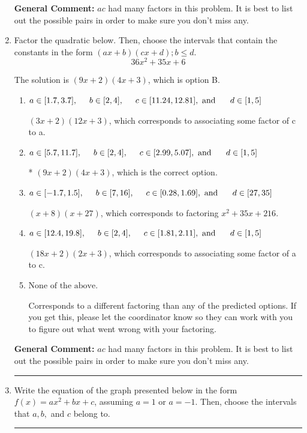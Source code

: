 \documentclass{extbook}[14pt]
\newcommand{\litem}[1]{\item #1

\rule{\textwidth}{0.4pt}}
\begin{document}
\begin{enumerate}
{\textbf{General Comment:} $ac$ had many factors in this problem. It is best to list out the possible pairs in order to make sure you don't miss any.
}
\litem{
Factor the quadratic below. Then, choose the intervals that contain the constants in the form $(ax+b)(cx+d); b \leq d.$
\[ 36x^{2} +35 x + 6 \]

The solution is \( (9x + 2)(4x + 3) \), which is option B.\begin{enumerate}[label=\Alph*.]
\item \( a \in [1.7, 3.7], \hspace*{5mm} b \in [2, 4], \hspace*{5mm} c \in [11.24, 12.81], \text{ and } \hspace*{5mm} d \in [1, 5] \)

 $(3x + 2)(12x + 3)$, which corresponds to associating some factor of c to a.
\item \( a \in [5.7, 11.7], \hspace*{5mm} b \in [2, 4], \hspace*{5mm} c \in [2.99, 5.07], \text{ and } \hspace*{5mm} d \in [1, 5] \)

* $(9x + 2)(4x + 3)$, which is the correct option.
\item \( a \in [-1.7, 1.5], \hspace*{5mm} b \in [7, 16], \hspace*{5mm} c \in [0.28, 1.69], \text{ and } \hspace*{5mm} d \in [27, 35] \)

 $(x + 8)(x + 27)$, which corresponds to factoring $x^{2} +35 x + 216$.
\item \( a \in [12.4, 19.8], \hspace*{5mm} b \in [2, 4], \hspace*{5mm} c \in [1.81, 2.11], \text{ and } \hspace*{5mm} d \in [1, 5] \)

 $(18x + 2)(2x + 3)$, which corresponds to associating some factor of a to c.
\item \( \text{None of the above.} \)

 Corresponds to a different factoring than any of the predicted options. If you get this, please let the coordinator know so they can work with you to figure out what went wrong with your factoring.
\end{enumerate}

\textbf{General Comment:} $ac$ had many factors in this problem. It is best to list out the possible pairs in order to make sure you don't miss any.
}
\litem{
Write the equation of the graph presented below in the form $f(x)=ax^2+bx+c$, assuming  $a=1$ or $a=-1$. Then, choose the intervals that $a, b,$ and $c$ belong to.

}
\end{enumerate}
\end{document}
